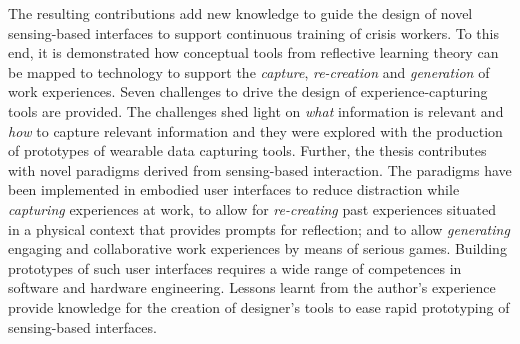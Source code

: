 The resulting contributions add new knowledge to guide the design of
novel sensing-based interfaces to support continuous training of crisis
workers. To this end, it is demonstrated how conceptual tools from
reflective learning theory can be mapped to technology to support the
\emph{capture}, \emph{re-creation} and \emph{generation} of work
experiences. Seven challenges to drive the design of
experience-capturing tools are provided. The challenges shed light on
\emph{what} information is relevant and \emph{how} to capture relevant
information and they were explored with the production of prototypes of
wearable data capturing tools. Further, the thesis contributes with
novel paradigms derived from sensing-based interaction. The paradigms
have been implemented in embodied user interfaces to reduce distraction
while \emph{capturing} experiences at work, to allow for
\emph{re-creating} past experiences situated in a physical context that
provides prompts for reflection; and to allow \emph{generating} engaging
and collaborative work experiences by means of serious games. Building
prototypes of such user interfaces requires a wide range of competences
in software and hardware engineering. Lessons learnt from the author's
experience provide knowledge for the creation of designer's tools to
ease rapid prototyping of sensing-based interfaces.
